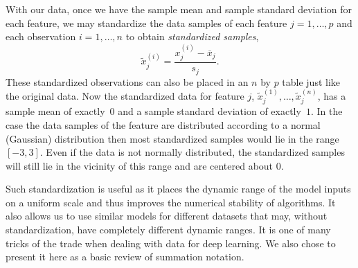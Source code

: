 With our data, once we have the sample mean and sample standard deviation for each feature, we may standardize the data samples of each feature $j=1,\ldots,p$ and each observation $i=1,\ldots,n$ to obtain \textit{standardized samples},
%
\begin{equation}
\label{eq:ref-stand-z}
\tilde{x}^{(i)}_j = \frac{x^{(i)}_j - \overline{x}_j}{s_j}.
\end{equation}
%
These standardized observations can also be placed in an $n$ by $p$ table just like the original data. Now the standardized data for feature $j$, $\tilde{x}_j^{(1)}, \ldots, \tilde{x}_j^{(n)}$, has a sample mean of exactly~$0$ and a sample standard deviation of exactly~$1$. In the case the data samples of the feature are distributed according to a normal (Gaussian) distribution then most standardized samples would lie in the range $[-3,3]$. Even if the data is not normally distributed, the standardized samples will still lie in the vicinity of this range and are centered about $0$.

Such standardization is useful as it places the dynamic range of the model inputs on a uniform scale and thus improves the numerical stability of algorithms. It also allows us to use similar models for different datasets that may, without standardization, have completely different dynamic ranges. It is one of many tricks of the trade when dealing with data for deep learning. We also chose to present it here as a basic review of summation notation.
